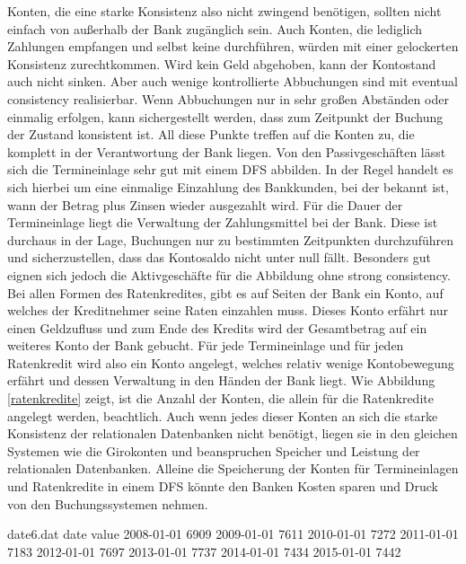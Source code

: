 \documentclass[12pt,oneside,a4paper,parskip]{scrbook}
\begin{document}
Konten, die eine starke Konsistenz also nicht zwingend benötigen, sollten nicht einfach von außerhalb der Bank zugänglich sein. Auch Konten, die lediglich Zahlungen empfangen und selbst keine durchführen, würden mit einer gelockerten Konsistenz zurechtkommen. Wird kein Geld abgehoben, kann der Kontostand auch nicht sinken. Aber auch wenige kontrollierte Abbuchungen sind mit eventual consistency realisierbar. Wenn Abbuchungen nur in sehr großen Abständen oder einmalig erfolgen, kann sichergestellt werden, dass zum Zeitpunkt der Buchung der Zustand konsistent ist. All diese Punkte treffen auf die Konten zu, die komplett in der Verantwortung der Bank liegen. Von den Passivgeschäften lässt sich die Termineinlage sehr gut mit einem DFS abbilden. In der Regel handelt es sich hierbei um eine einmalige Einzahlung des Bankkunden, bei der bekannt ist, wann der Betrag plus Zinsen wieder ausgezahlt wird. Für die Dauer der Termineinlage liegt die Verwaltung der Zahlungsmittel bei der Bank. Diese ist durchaus in der Lage, Buchungen nur zu bestimmten Zeitpunkten durchzuführen und sicherzustellen, dass das Kontosaldo nicht unter null fällt. Besonders gut eignen sich jedoch die Aktivgeschäfte für die Abbildung ohne strong consistency. Bei allen Formen des Ratenkredites, gibt es auf Seiten der Bank ein Konto, auf welches der Kreditnehmer seine Raten einzahlen muss. Dieses Konto erfährt nur einen Geldzufluss und zum Ende des Kredits wird der Gesamtbetrag auf ein weiteres Konto der Bank gebucht. Für jede Termineinlage und für jeden Ratenkredit wird also ein Konto angelegt, welches relativ wenige Kontobewegung erfährt und dessen Verwaltung in den Händen der Bank liegt. Wie Abbildung \ref{ratenkredite} zeigt, ist die Anzahl der Konten, die allein für die Ratenkredite angelegt werden, beachtlich. Auch wenn jedes dieser Konten an sich die starke Konsistenz der relationalen Datenbanken nicht benötigt, liegen sie in den gleichen Systemen wie die Girokonten und beanspruchen Speicher und Leistung der relationalen Datenbanken. Alleine die Speicherung der Konten für Termineinlagen und Ratenkredite in einem DFS könnte den Banken Kosten sparen und Druck von den Buchungssystemen nehmen.

\begin{filecontents}{date6.dat}
date       value
2008-01-01  6909
2009-01-01  7611
2010-01-01  7272
2011-01-01  7183
2012-01-01  7697
2013-01-01  7737
2014-01-01  7434
2015-01-01  7442
\end{filecontents}
\end{document}

